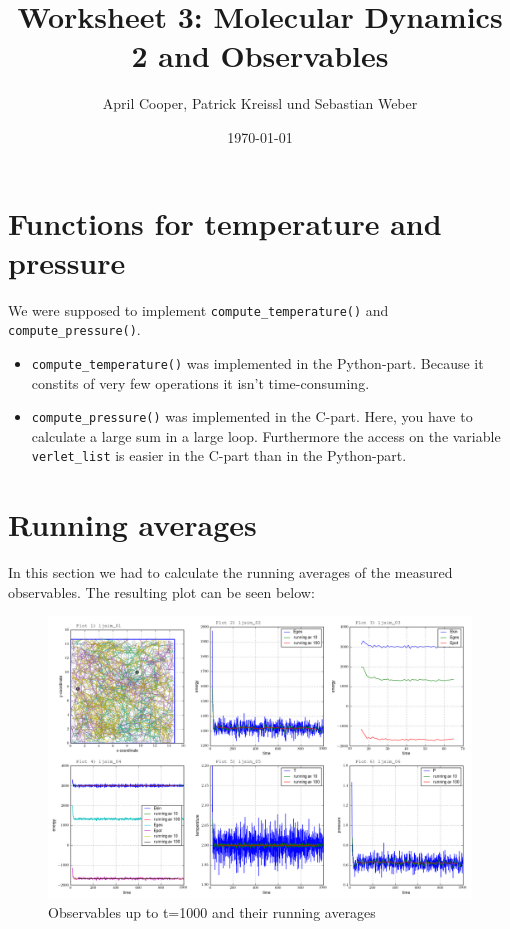 \documentclass[12pt,a4paper]{scrartcl}
\author{April Cooper, Patrick Kreissl und Sebastian Weber}
\title{Worksheet 3: Molecular Dynamics 2 and Observables}
\date{\today}
\begin{document}
\maketitle
\tableofcontents
\newpage

\section{Functions for temperature and pressure }

We were supposed to implement \verb+compute_temperature()+ and \verb+compute_pressure()+.
\begin{itemize}
\item \verb+compute_temperature()+ was implemented in the Python-part. Because it constits of very few operations it isn't time-consuming.
\item \verb+compute_pressure()+ was implemented in the C-part. Here, you have to calculate a large sum in a large loop. Furthermore the access on the variable \verb+verlet_list+ is easier in the C-part than in the Python-part.
\end{itemize}



\section{Running averages}
In this section we had to calculate the running averages of the measured observables.
The resulting plot can be  seen below:
\begin{figure}[H]
\centering
\includegraphics[width=16.0cm]{../plots/t1000.png}
\caption{Observables up to t=1000 and their running averages}
\label{fig:running averages}
\end{figure}
\end{document}
